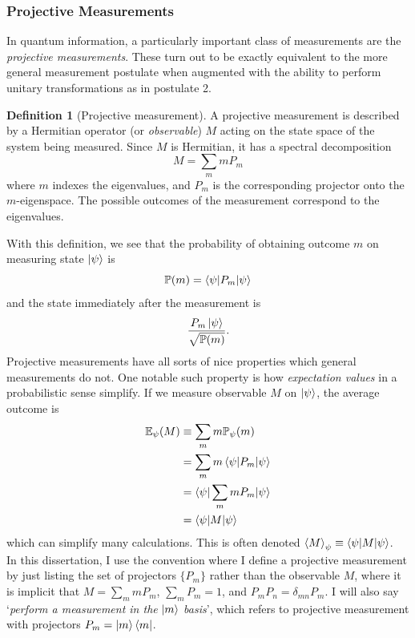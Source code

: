\documentclass[12pt,a4paper]{report}
\numberwithin{equation}{section}
\newcommand{\ketbra}[2]{\ket{#1}\bra{#2}}
\newcommand{\ketbras}[1]{\ketbra{#1}{#1}}
\theoremstyle{definition}
\newtheorem{definition}{Definition}[section]
\theoremstyle{theorem}
\theoremstyle{theorem}
\theoremstyle{example}
\theoremstyle{definition}
\begin{document}
\subsubsection{Projective Measurements}
In quantum information, a particularly important class of measurements are the \textit{projective measurements}. These turn out to be exactly equivalent to the more general measurement postulate when augmented with the ability to perform unitary transformations as in postulate 2.
\begin{definition}[Projective measurement]
	A projective measurement is described by a Hermitian operator (or \textit{observable}) $M$ acting on the state space of the system being measured. Since $M$ is Hermitian, it has a spectral decomposition
	\begin{equation}
		M=\sum_{m}mP_{m}
	\end{equation}
	where $m$ indexes the eigenvalues, and $P_{m}$ is the corresponding projector onto the $m$-eigenspace. The possible outcomes of the measurement correspond to the eigenvalues. 
\end{definition}
With this definition, we see that the probability of obtaining outcome $m$ on measuring state $\ket{\psi}$ is
\begin{equation}
	\mathbb{P}(m)=\braket{\psi|P_{m}|\psi}
\end{equation}
and the state immediately after the measurement is
\begin{equation}
	\frac{P_{m}\ket{\psi}}{\sqrt{\mathbb{P}(m)}}.
\end{equation}
Projective measurements have all sorts of nice properties which general measurements do not. One notable such property is how \textit{expectation values} in a probabilistic sense simplify. If we measure observable $M$ on $\ket{\psi}$, the average outcome is
\begin{equation}
	\begin{aligned}
		\mathbb{E}_{\psi}(M)&\equiv\sum_{m}m\mathbb{P}_{\psi}(m)\\&=\sum_{m}m\braket{\psi|P_{m}|\psi}\\&=\braket{\psi|\sum_{m}mP_{m}|\psi}\\&=\braket{\psi|M|\psi}
	\end{aligned}
\end{equation}
which can simplify many calculations. This is often denoted $\braket{M}_{\psi}\equiv\braket{\psi|M|\psi}$.\\
In this dissertation, I use the convention where I define a projective measurement by just listing the set of projectors $\{P_{m}\}$ rather than the observable $M$, where it is implicit that $M=\sum_{m}mP_{m}$, $\sum_{m}P_{m}=1$, and $P_{m}P_{n}=\delta_{mn}P_{m}$. I will also say `\textit{perform a measurement in the} $\ket{m}$ \textit{basis}', which refers to projective measurement with projectors $P_{m}=\ketbras{m}$.
\end{document}
